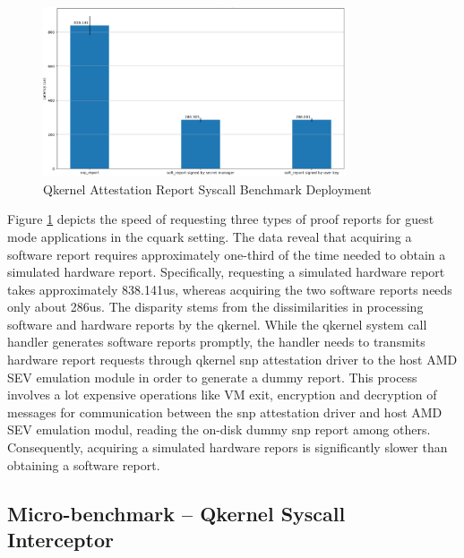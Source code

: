 \begin{figure}[H]
    \centering
    \includegraphics[width=0.8\textwidth]{images/perf_attestation_report_result.PNG}
    \caption[Benchmark result of Attestation Report Syscall]{Qkernel Attestation Report Syscall Benchmark Deployment}
    \label{fig:perf_attestation_report_result}
\end{figure}

Figure \ref{fig:perf_attestation_report_result} depicts the speed of requesting three types of proof reports for guest mode applications in the cquark setting. The data reveal that acquiring a software report requires approximately one-third of the time needed to obtain a simulated hardware report. 
Specifically, requesting a simulated hardware report takes approximately 838.141us, whereas acquiring the two software reports needs only about 286us. The disparity stems from the dissimilarities in processing software and hardware reports by the qkernel. While the qkernel 
system call handler generates software reports promptly, the handler needs to transmits hardware report requests through qkernel snp attestation driver to the host AMD SEV emulation module in order to generate a dummy report. This process involves a lot expensive operations like VM exit, 
encryption and decryption of messages for communication between the snp attestation driver and host AMD SEV emulation modul, reading the on-disk dummy snp report among others. Consequently, acquiring a simulated hardware repors is significantly slower than obtaining a software report.


\subsection{Micro-benchmark – Qkernel Syscall Interceptor}

